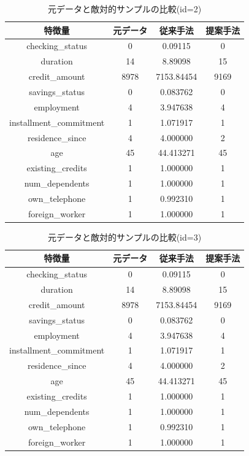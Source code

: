 \begin{table}[H]
    \centering
    \caption{元データと敵対的サンプルの比較(id=2)}
    \begin{tabular}{|c|c|c|c|} \hline
        特徴量 & 元データ & 従来手法 & 提案手法 \\ \hline
        checking\_status & 0 & 0.09115 & 0\\ \hline
        duration & 14 & 8.89098 & 15 \\ \hline
        credit\_amount & 8978 & 7153.84454 & 9169 \\ \hline
        savings\_status & 0 & 0.083762 & 0\\ \hline
        employment & 4 & 3.947638  & 4 \\ \hline
        installment\_commitment & 1 & 1.071917 & 1\\ \hline
        residence\_since & 4 & 4.000000 & 2 \\ \hline
        age & 45 & 44.413271 & 45 \\ \hline
        existing\_credits & 1 & 1.000000 & 1 \\ \hline
        num\_dependents & 1 & 1.000000 & 1 \\ \hline
        own\_telephone & 1 & 0.992310 & 1 \\ \hline
        foreign\_worker & 1 & 1.000000 & 1 \\ \hline
    \end{tabular}
\end{table}

\begin{table}[H]
    \centering
    \caption{元データと敵対的サンプルの比較(id=3)}
    \begin{tabular}{|c|c|c|c|} \hline
        特徴量 & 元データ & 従来手法 & 提案手法 \\ \hline
        checking\_status & 0 & 0.09115 & 0\\ \hline
        duration & 14 & 8.89098 & 15 \\ \hline
        credit\_amount & 8978 & 7153.84454 & 9169 \\ \hline
        savings\_status & 0 & 0.083762 & 0\\ \hline
        employment & 4 & 3.947638  & 4 \\ \hline
        installment\_commitment & 1 & 1.071917 & 1\\ \hline
        residence\_since & 4 & 4.000000 & 2 \\ \hline
        age & 45 & 44.413271 & 45 \\ \hline
        existing\_credits & 1 & 1.000000 & 1 \\ \hline
        num\_dependents & 1 & 1.000000 & 1 \\ \hline
        own\_telephone & 1 & 0.992310 & 1 \\ \hline
        foreign\_worker & 1 & 1.000000 & 1 \\ \hline
    \end{tabular}
\end{table}

